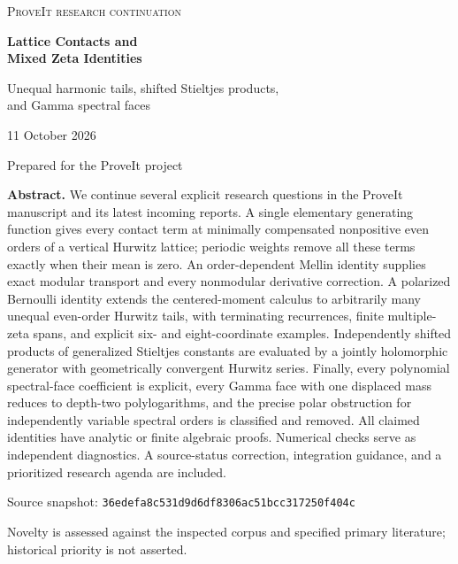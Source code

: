 

\hypersetup{pageanchor=false}
\begin{titlepage}
\centering
\vspace*{0.7in}
{\large\color{linkblue}\textsc{ProveIt research continuation}\par}
\vspace{0.35in}
{\Huge\bfseries\color{inkblue} Lattice Contacts and\\[5pt] Mixed Zeta Identities\par}
\vspace{0.22in}
{\Large Unequal harmonic tails, shifted Stieltjes products,\\[3pt]
and Gamma spectral faces\par}
\vspace{0.4in}
{\large 11 October 2026\par}
\vspace{0.2in}
{\normalsize Prepared for the ProveIt project\par}
\vspace{0.4in}
\begin{minipage}{0.9\textwidth}
\textbf{Abstract.}
We continue several explicit research questions in the ProveIt
manuscript and its latest incoming reports. A single elementary
generating function gives every contact term at minimally compensated
nonpositive even orders of a vertical Hurwitz lattice; periodic
weights remove all these terms exactly when their mean is zero.
An order-dependent Mellin identity supplies exact modular transport
and every nonmodular derivative correction. A polarized Bernoulli
identity extends the centered-moment calculus to arbitrarily many
unequal even-order Hurwitz tails, with terminating recurrences,
finite multiple-zeta spans, and explicit six- and eight-coordinate
examples. Independently shifted products of generalized Stieltjes
constants are evaluated by a jointly holomorphic generator with
geometrically convergent Hurwitz series. Finally, every polynomial
spectral-face coefficient is explicit, every Gamma face with one
displaced mass reduces to depth-two polylogarithms, and the precise
polar obstruction for independently variable spectral orders is
classified and removed. All claimed identities have analytic or
finite algebraic proofs. Numerical checks serve as independent
diagnostics. A source-status correction, integration guidance, and
a prioritized research agenda are included.
\end{minipage}
\vfill
{\small Source snapshot: \texttt{36edefa8c531d9d6df8306ac51bcc317250f404c}\par}
{\small Novelty is assessed against the inspected corpus and specified
primary literature; historical priority is not asserted.\par}
\end{titlepage}
